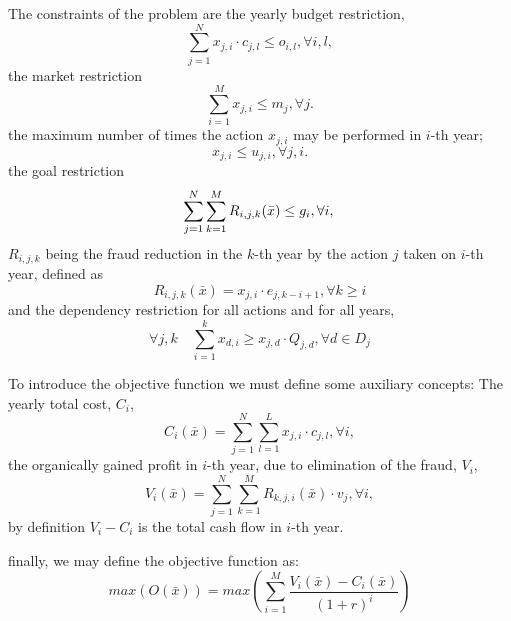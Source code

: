 The constraints of the problem are the yearly budget restriction,
\begin{equation}
    \sum_{j=1}^{N} x_{j, i} \cdot c_{j,l} \le o_{i,l}, \forall i, l,
	\label{eq:budget}
\end{equation}
the market restriction
\begin{equation}
     \sum_{i=1}^{M} x_{j, i} \le m_j, \forall j.
	\label{eq:market}
\end{equation}
the maximum number of times the action $x_{j, i}$ may be performed in $i$-th year;
\begin{equation}
     x_{j, i} \le u_{j, i}, \forall j, i.
	\label{eq:maxacts}
\end{equation}
the goal restriction
\begin{equation}
    \label{eq:goal}
    \sum_{j=1}^{N} \sum_{k=1}^{M}R_{i,j,k}(\bar{x}) \leq g_i, \forall i, \\
\end{equation}
$R_{i,j,k}$ being the fraud reduction in the $k$-th year by the action $j$ taken on $i$-th year, defined as
\begin{equation}
    \label{eq:rec}
    R_{i,j,k}(\bar{x}) = x_{j, i} \cdot e_{j, k - i + 1}, \forall k \geq i
\end{equation}
and the dependency restriction for all actions and for all years,
\begin{equation}
    \label{eq:dependency}
    \forall j,k \quad \sum_{i=1}^{k} x_{d, i} \ge x_{j, d} \cdot Q_{j, d}, \forall d \in D_j
\end{equation}

To introduce the objective function we must define some auxiliary concepts:
The yearly total cost, $C_i$,
\begin{equation}
\label{eq:cost}
C_{i}(\bar{x}) =  \sum_{j=1}^{N} \sum_{l=1}^{L} x_{j, i} \cdot c_{j,l}, \forall i,
\end{equation}
the organically gained profit in $i$-th year, due to elimination of the fraud, $V_i$,
\begin{equation}
    V_{i}(\bar{x}) = \sum_{j=1}^{N} \sum_{k=1}^{M} R_{k, j, i}(\bar{x}) \cdot v_j, \forall i,
\end{equation}
by definition $V_i - C_i$ is the total cash flow in $i$-th year. 

finally, we may define the objective function as:
\begin{equation}
    \label{eq:objective}
    max(O(\bar{x})) = max\left(\sum_{i=1}^{M} \frac{V_i(\bar{x}) - C_i(\bar{x})}{(1+r)^i}\right)
\end{equation}


